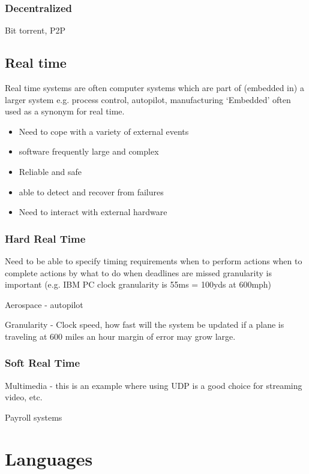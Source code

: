 \documentclass[a4paper,oneside]{article}
\begin{document}
		\subsubsection{Decentralized}

			Bit torrent, P2P

	\subsection{Real time}
			Real time systems are often computer systems which are part of (embedded in) a larger system e.g. process control, autopilot, manufacturing ‘Embedded’ often used as a synonym for real time.

	\begin{itemize}
		\item	Need to cope with a variety of external events
		\item  software frequently large and complex
		\item Reliable and safe
		\item able to detect and recover from failures
		\item Need to interact with external hardware
	\end{itemize}


		\subsubsection{Hard Real Time}
		

			Need to be able to specify timing requirements
			when to perform actions
			when to complete actions by
			what to do when deadlines are missed 
			granularity is important (e.g. IBM PC clock granularity is 55ms = 100yds at 600mph)


			Aerospace - autopilot

			Granularity - Clock speed, how fast will the system be updated if a plane is traveling at 600 miles an hour 		margin of error may grow large. 




		\subsubsection{Soft Real Time}
			
			Multimedia - this is an example where using UDP is a good choice for streaming video, etc. 

			Payroll systems


\section{Languages}
\end{document}
